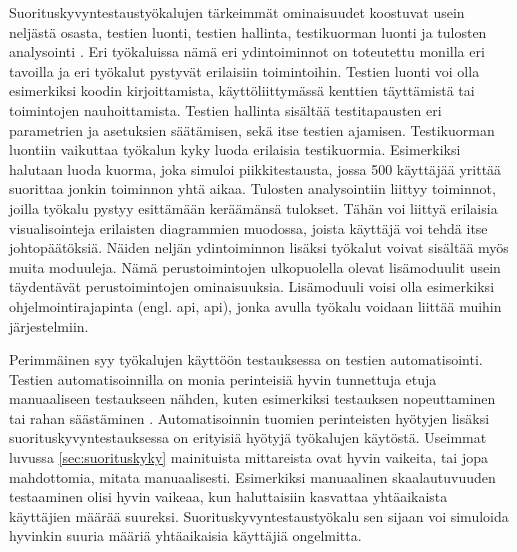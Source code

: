 Suorituskyvyntestaustyökalujen tärkeimmät ominaisuudet koostuvat usein neljästä osasta, testien luonti, testien hallinta, testikuorman luonti ja tulosten analysointi \parencite[12]{TheArtOfApplication}. Eri työkaluissa nämä eri ydintoiminnot on toteutettu monilla eri tavoilla ja eri työkalut pystyvät erilaisiin toimintoihin. Testien luonti voi olla esimerkiksi koodin kirjoittamista, käyttöliittymässä kenttien täyttämistä tai toimintojen nauhoittamista. Testien hallinta sisältää testitapausten eri parametrien ja asetuksien säätämisen, sekä itse testien ajamisen. Testikuorman luontiin vaikuttaa työkalun kyky luoda erilaisia testikuormia. Esimerkiksi halutaan luoda kuorma, joka simuloi piikkitestausta, jossa 500 käyttäjää yrittää suorittaa jonkin toiminnon yhtä aikaa. Tulosten analysointiin liittyy toiminnot, joilla työkalu pystyy esittämään keräämänsä tulokset. Tähän voi liittyä erilaisia visualisointeja erilaisten diagrammien muodossa, joista käyttäjä voi tehdä itse johtopäätöksiä. \parencite{ComparativeAnalysisOfWeb} Näiden neljän ydintoiminnon lisäksi työkalut voivat sisältää myös muita moduuleja. Nämä perustoimintojen ulkopuolella olevat lisämoduulit usein täydentävät perustoimintojen ominaisuuksia. \parencite[13]{TheArtOfApplication} Lisämoduuli voisi olla esimerkiksi ohjelmointirajapinta (engl. \acrlong{api}, \acrshort{api}), jonka avulla työkalu voidaan liittää muihin järjestelmiin.

Perimmäinen syy työkalujen käyttöön testauksessa on testien automatisointi. Testien automatisoinnilla on monia perinteisiä hyvin tunnettuja etuja manuaaliseen testaukseen nähden, kuten esimerkiksi testauksen nopeuttaminen tai rahan säästäminen \parencite[528]{AgileTestingAPracticalGuide}. Automatisoinnin tuomien perinteisten hyötyjen lisäksi suorituskyvyntestauksessa on erityisiä hyötyjä työkalujen käytöstä. Useimmat luvussa \ref{sec:suorituskyky} mainituista mittareista ovat hyvin vaikeita, tai jopa mahdottomia, mitata manuaalisesti. Esimerkiksi manuaalinen skaalautuvuuden testaaminen olisi hyvin vaikeaa, kun haluttaisiin kasvattaa yhtäaikaista käyttäjien määrää suureksi. Suorituskyvyntestaustyökalu sen sijaan voi simuloida hyvinkin suuria määriä yhtäaikaisia käyttäjiä ongelmitta.
